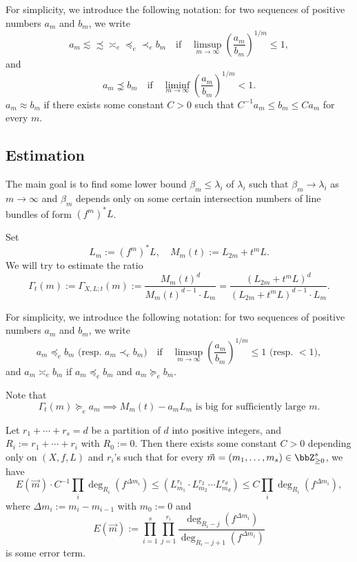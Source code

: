     
  For simplicity, we introduce the following notation: for two sequences of positive numbers $a_m$ and $b_m$, we write 
  \[ a_m \lesssim \precsim \asymp_e \preccurlyeq_e \prec_e  b_m \quad \text{if} \quad \limsup_{m \to \infty} \left(\frac{a_m}{b_m}\right)^{1/m} \leq 1, \]
  and\Yang{}
  \[ a_m \precnsim b_m \quad \text{if} \quad \liminf_{m \to \infty} \left(\frac{a_m}{b_m}\right)^{1/m} < 1. \]
  $a_m \approx b_m$ if there exists some constant $C > 0$ such that $C^{-1} a_m \leq b_m \leq C a_m$ for every $m$.\Yang{}







\subsection{Estimation}

  The main goal is to find some lower bound $\beta_m \leq \lambda_i$ of $\lambda_i$ such that $\beta_m \to \lambda_i$ as $m \to \infty$ and $\beta_m$ depends only on some certain intersection numbers of line bundles of form $(f^m)^* L$.

  Set 
  \[ L_m := (f^m)^* L, \quad M_m(t) := L_{2m} + t^m L. \]
  We will try to estimate the ratio
  \[ \Gamma_t(m) := \Gamma_{X,L;t}(m) := \frac{M_m(t)^{d}}{M_m(t)^{d-1} \cdot L_m} = \frac{(L_{2m} + t^m L)^{d}}{(L_{2m} + t^m L)^{d-1} \cdot L_m}. \]

  For simplicity, we introduce the following notation: for two sequences of positive numbers $a_m$ and $b_m$, we write
  \[ a_m \preccurlyeq_e b_m \text{ (resp. }a_m \prec_e b_m)  \quad \text{if} \quad \limsup_{m \to \infty} \left(\frac{a_m}{b_m}\right)^{1/m} \leq 1 \text{ (resp. } < 1), \]
  and $a_m \asymp_e b_m$ if $a_m \preccurlyeq_e b_m$ and $a_m \succcurlyeq_e b_m$.\Yang{}

  Note that 
  \[ \Gamma_t(m) \succcurlyeq_e  a_m \implies M_m(t) - a_m L_m \text{ is big for sufficiently large } m. \]
  

  \begin{proposition}
    \Yang{}
    Let $r_1 + \cdots + r_s = d$ be a partition of $d$ into positive integers, and $R_i := r_1 + \cdots + r_i$ with $R_0 := 0$.
    Then there exists some constant $C > 0$ depending only on $(X,f,L)$ and $r_i$'s such that for every $\vec{m} = (m_1, \ldots, m_s) \in \bbZ_{\geq 0}^s$, we have
    \[ E(\vec{m}) \cdot C^{-1}\prod_i \deg_{R_i}(f^{\Delta m_i}) \leq (L_{m_1}^{r_1} \cdot L_{m_2}^{r_2} \cdots L_{m_d}^{r_d}) \leq C \prod_i \deg_{R_i}(f^{\Delta m_i}), \]
    where $\Delta m_i := m_i - m_{i-1}$ with $m_0 := 0$ and
    \Yang{}
    \[ E(\vec{m}) := \prod_{i=1}^s \prod_{j=1}^{r_i} \frac{\deg_{R_i - j}(f^{\Delta m_i})}{\deg_{R_i - j + 1}(f^{\Delta m_i})} \]
    is some error term.
  \end{proposition}







